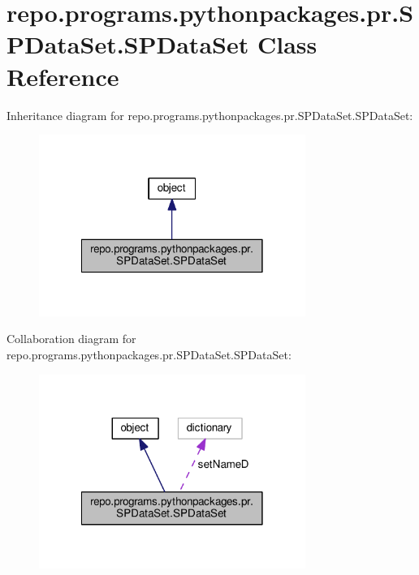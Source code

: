 \hypertarget{classrepo_1_1programs_1_1pythonpackages_1_1pr_1_1SPDataSet_1_1SPDataSet}{\section{repo.\-programs.\-pythonpackages.\-pr.\-S\-P\-Data\-Set.\-S\-P\-Data\-Set Class Reference}
\label{classrepo_1_1programs_1_1pythonpackages_1_1pr_1_1SPDataSet_1_1SPDataSet}
}


Inheritance diagram for repo.\-programs.\-pythonpackages.\-pr.\-S\-P\-Data\-Set.\-S\-P\-Data\-Set\-:
\nopagebreak
\begin{figure}[H]
\begin{center}
\leavevmode
\includegraphics[width=246pt]{classrepo_1_1programs_1_1pythonpackages_1_1pr_1_1SPDataSet_1_1SPDataSet__inherit__graph}
\end{center}
\end{figure}


Collaboration diagram for repo.\-programs.\-pythonpackages.\-pr.\-S\-P\-Data\-Set.\-S\-P\-Data\-Set\-:
\nopagebreak
\begin{figure}[H]
\begin{center}
\leavevmode
\includegraphics[width=246pt]{classrepo_1_1programs_1_1pythonpackages_1_1pr_1_1SPDataSet_1_1SPDataSet__coll__graph}
\end{center}
\end{figure}
